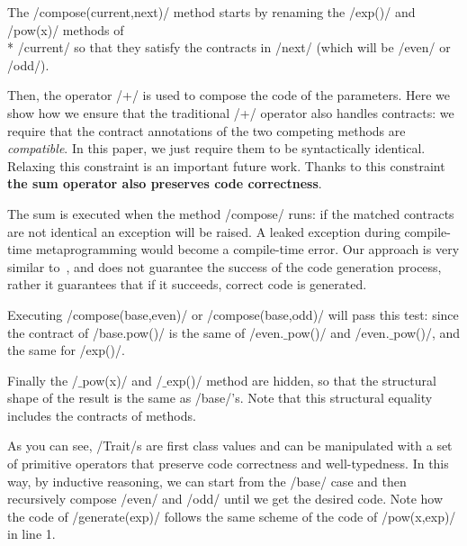 
The /compose(current,next)/ method starts by renaming the /exp()/ and /pow(x)/ methods of\\* /current/
so that they satisfy the contracts in /next/ (which will be 
/even/ or /odd/).

Then, the operator /+/ is used to compose the code of the parameters.
Here we show how we ensure that the traditional /+/ operator also handles contracts: we require that the contract annotations of the two competing methods are \emph{compatible}.
In this paper, we just require them to be syntactically identical. Relaxing this constraint is an important future work.
Thanks to this constraint \textbf{the sum operator also preserves code correctness}. %

The sum is executed when the method /compose/
runs: if the matched contracts are not identical an exception will be raised. A leaked exception during compile-time metaprogramming would become a compile-time error. 
Our approach is very similar to~\cite{servetto2014meta}, and does not guarantee the success of the code generation process, rather it guarantees that if it succeeds, correct code is generated.

Executing /compose(base,even)/ or /compose(base,odd)/ will pass this test: since the contract of /base.pow()/
is the same of /even.$\_$pow()/ and /even.$\_$pow()/, and the same for /exp()/.

Finally the /$\_$pow(x)/ and /$\_$exp()/ method are hidden, so that the structural shape of the result is
the same as /base/'s.
Note that this structural equality includes the contracts of methods.

As you can see, /Trait/s are first class values and can be manipulated with a set of primitive operators that preserve code correctness and well-typedness.
In this way, by inductive reasoning, we can start from the /base/ case and then recursively compose /even/ and /odd/ until we get the desired code.
Note how the code of /generate(exp)/ follows the same scheme of the code of /pow(x,exp)/ in line 1.

